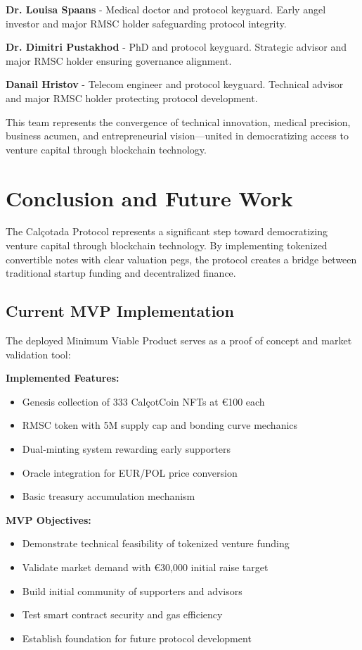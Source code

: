 \documentclass[conference]{IEEEtran}
\begin{document}
\textbf{Dr. Louisa Spaans} - Medical doctor and protocol keyguard. Early angel investor and major RMSC holder safeguarding protocol integrity.

\textbf{Dr. Dimitri Pustakhod} - PhD and protocol keyguard. Strategic advisor and major RMSC holder ensuring governance alignment.

\textbf{Danail Hristov} - Telecom engineer and protocol keyguard. Technical advisor and major RMSC holder protecting protocol development.

This team represents the convergence of technical innovation, medical precision, business acumen, and entrepreneurial vision—united in democratizing access to venture capital through blockchain technology.

\section{Conclusion and Future Work}

The Calçotada Protocol represents a significant step toward democratizing venture capital through blockchain technology. By implementing tokenized convertible notes with clear valuation pegs, the protocol creates a bridge between traditional startup funding and decentralized finance.

\subsection{Current MVP Implementation}

The deployed Minimum Viable Product serves as a proof of concept and market validation tool:

\textbf{Implemented Features:}
\begin{itemize}
    \item Genesis collection of 333 CalçotCoin NFTs at €100 each
    \item RMSC token with 5M supply cap and bonding curve mechanics
    \item Dual-minting system rewarding early supporters
    \item Oracle integration for EUR/POL price conversion
    \item Basic treasury accumulation mechanism
\end{itemize}

\textbf{MVP Objectives:}
\begin{itemize}
    \item Demonstrate technical feasibility of tokenized venture funding
    \item Validate market demand with €30,000 initial raise target
    \item Build initial community of supporters and advisors
    \item Test smart contract security and gas efficiency
    \item Establish foundation for future protocol development
\end{itemize}
\end{document}
